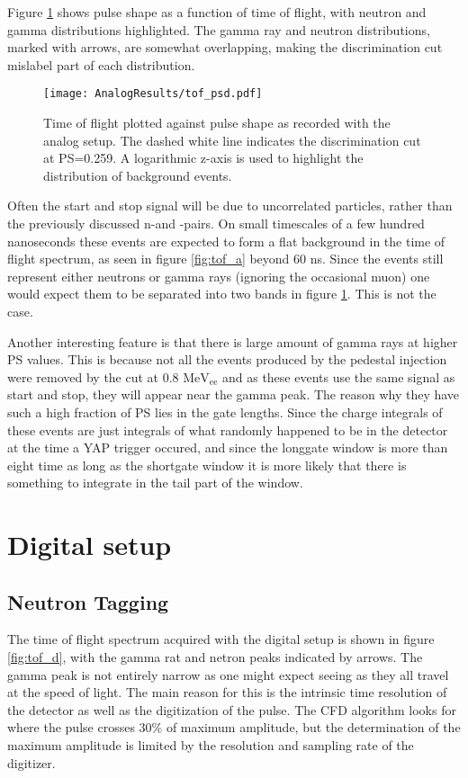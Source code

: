 \documentclass[main.tex]{subfiles}
\begin{document}
Figure \ref{fig:tof_ps_a} shows pulse shape as a function of time of flight, with neutron and gamma distributions highlighted. The gamma ray and neutron distributions, marked with arrows, are somewhat overlapping, making the discrimination cut mislabel part of each distribution.

\begin{figure}[ht]
    \centering
        \texttt{[image: AnalogResults/tof\_psd.pdf]}
        \caption[Heatmap of pulse shape as a function of time of flight.]{Time of flight plotted against pulse shape as recorded with the analog setup. The dashed white line indicates the discrimination cut at PS=0.259. A logarithmic z-axis is used to highlight the distribution of background events.}
    \label{fig:tof_ps_a} 
\end{figure}


Often the start and stop signal will be due to uncorrelated particles, rather than the previously discussed n-\textgamma and \textgamma-\textgamma pairs. On small timescales of a few hundred nanoseconds these events are expected to form a flat background in the time of flight spectrum, as seen in figure \ref{fig:tof_a} beyond 60 ns. Since the events still represent either neutrons or gamma rays (ignoring the occasional muon) one would expect them to be separated into two bands in figure \ref{fig:tof_ps_a}. This is not the case.

Another interesting feature is that there is large amount of gamma rays at higher PS values. This is because not all the events produced by the pedestal injection were removed by the cut at 0.8 $\text{MeV}_\text{ee}$ and as these events use the same signal as start and stop, they will appear near the gamma peak. The reason why they have such a high fraction of PS lies in the gate lengths. Since the charge integrals of these events are just integrals of what randomly happened to be in the detector at the time a YAP trigger occured, and since the longgate window is more than eight time as long as the shortgate window it is more likely that there is something to integrate in the tail part of the window.



\section{Digital setup}

\subsection{Neutron Tagging}
The time of flight spectrum acquired with the digital setup is shown in figure \ref{fig:tof_d}, with the gamma rat and netron peaks indicated by arrows. The gamma peak is not entirely narrow as one might expect seeing as they all travel at the speed of light. The main reason for this is the intrinsic time resolution of the detector as well as the digitization of the pulse. The CFD algorithm looks for where the pulse crosses 30\% of maximum amplitude, but the determination of the maximum amplitude is limited by the resolution and sampling rate of the digitizer.
\end{document}
